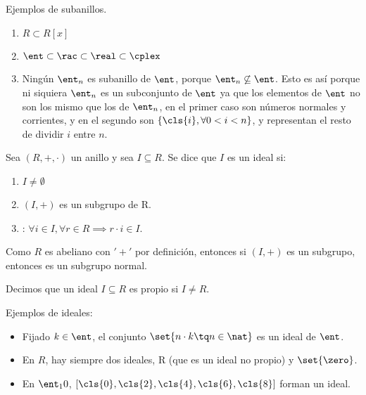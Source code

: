 \begin{example} Ejemplos de subanillos.
	\begin{enumerate}
		\item $R \subset R[x]$
		\item $\ent \subset \rac \subset \real \subset \cplex$
		\item Ningún $\ent_n$ es subanillo de $\ent$, porque $\ent_n \not \subseteq \ent$. Esto es así porque ni siquiera $\ent_n$ es un subconjunto de $\ent$ ya que los elementos de $\ent$ no son los mismo que los de $\ent_n$, en el primer caso son números normales y corrientes, y en el segundo son $\{\cls{i},  \forall 0<i<n\}$, y representan el resto de dividir $i$ entre $n$.
	\end{enumerate}
\end{example}


\begin{defn}[Ideal] %
Sea $(R,+,\cdot)$ un anillo y sea $I \subseteq R$. Se dice que $I$ es un ideal si:

	\begin{enumerate}
		\item $I \neq \emptyset$
		\item $(I, +)$ es un subgrupo de R.
		\item {}: $\forall i \in I, \forall r \in R \implies r\cdot i \in I$.
	\end{enumerate}
\end{defn}

\obs Como $R$ es abeliano con  $'+'$ por definición, entonces si $(I,+)$ es un subgrupo, entonces es un subgrupo normal.

\begin{defn}
	Decimos que un ideal $I \subseteq R$ es propio si $I \neq R$.
\end{defn}

\begin{example} Ejemplos de ideales:
	\begin{itemize}
		\item Fijado $k \in \ent$, el conjunto $\set{n\cdot k \tq n \in \nat }$ es un ideal de $\ent$.
		\item En $R$, hay siempre dos ideales, R (que es un ideal no propio) y $\set{\zero}$.
		\item En $\ent_10$, $[\cls{0},\cls{2},\cls{4},\cls{6},\cls{8} ]$ forman un ideal.
	\end{itemize}
\end{example}

